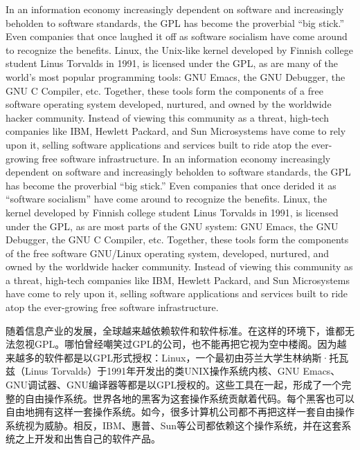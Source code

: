 \fi

\ifdefined\eng
\ifdefined\vone
In an information economy increasingly dependent on software and increasingly beholden to software standards, the GPL has become the proverbial ``big stick.'' Even companies that once laughed it off as software socialism have come around to recognize the benefits. Linux, the Unix-like kernel developed by Finnish college student Linus Torvalds in 1991, is licensed under the GPL, as are many of the world's most popular programming tools: GNU Emacs, the GNU Debugger, the GNU C Compiler, etc. Together, these tools form the components of a free software operating system developed, nurtured, and owned by the worldwide hacker community. Instead of viewing this community as a threat, high-tech companies like IBM, Hewlett Packard, and Sun Microsystems have come to rely upon it, selling software applications and services built to ride atop the ever-growing free software infrastructure.
\fi
\ifdefined\vtwo
In an information economy increasingly dependent on software and increasingly beholden to software standards, the GPL has become the proverbial ``big stick.'' Even companies that once derided it as ``software socialism'' have come around to recognize the benefits. Linux, the kernel developed by Finnish college student Linus Torvalds in 1991, is licensed under the GPL, as are most parts of the GNU system: GNU Emacs, the GNU Debugger, the GNU C Compiler, etc. Together, these tools form the components of the free software GNU/Linux operating system, developed, nurtured, and owned by the worldwide hacker community. Instead of viewing this community as a threat, high-tech companies like IBM, Hewlett Packard, and Sun Microsystems have come to rely upon it, selling software applications and services built to ride atop the ever-growing free software infrastructure.
\fi
\fi

\ifdefined\chs
随着信息产业的发展，全球越来越依赖软件和软件标准。在这样的环境下，谁都无法忽视GPL。哪怕曾经嘲笑过GPL的公司，也不能再把它视为空中楼阁。因为越来越多的软件都是以GPL形式授权：Linux，一个最初由芬兰大学生林纳斯·托瓦兹（Linus Torvalds）于1991年开发出的类UNIX操作系统内核、GNU Emacs、GNU调试器、GNU编译器等都是以GPL授权的。这些工具在一起，形成了一个完整的自由操作系统。世界各地的黑客为这套操作系统贡献着代码。每个黑客也可以自由地拥有这样一套操作系统。如今，很多计算机公司都不再把这样一套自由操作系统视为威胁。相反，IBM、惠普、Sun等公司都依赖这个操作系统，并在这套系统之上开发和出售自己的软件产品。
\ifdefined\vtwo
\fi
\fi

